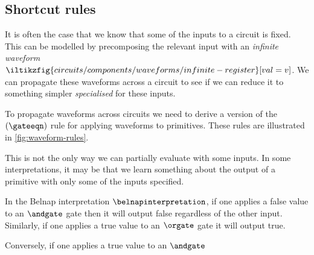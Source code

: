 \subsection{Shortcut rules}

It is often the case that we know that some of the inputs to a circuit is fixed.
This can be modelled by precomposing the relevant input with an
\emph{infinite waveform} \(
\iltikzfig{circuits/components/waveforms/infinite-register}[val=v]
\).
We can propagate these waveforms across a circuit to see if we can reduce it to
something simpler \emph{specialised} for these inputs.

To propagate waveforms across circuits we need to derive a version of the
\((\gateeqn)\) rule for applying waveforms to primitives.
These rules are illustrated in \cref{fig:waveform-rules}.



This is not the only way we can partially evaluate with some inputs.
In some interpretations, it may be that we learn something about the output of
a primitive with only some of the inputs specified.

\begin{example}
    In the Belnap interpretation \(\belnapinterpretation\), if one applies a
    false value to an \(\andgate\) gate then it will output false regardless of
    the other input.
    Similarly, if one applies a true value to an \(\orgate\) gate it will output
    true.

    Conversely, if one applies a true value to an \(\andgate\)

\end{example}



